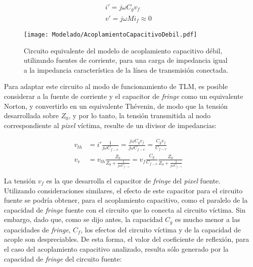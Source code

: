 \begin{subequations}
	\label{eq:expresiones-fuentes-controladas}
	\begin{align}
		i' = j \omega C_g v_f \\
		v' = j \omega M i_f \approx 0
	\end{align}
\end{subequations}

\begin{figure}[htp]
	\centering
	\texttt{[image: Modelado/AcoplamientoCapacitivoDebil.pdf]}
	\caption{Circuito equivalente del modelo de acoplamiento capacitivo débil, utilizando fuentes de corriente, para una carga de impedancia igual a la impedancia característica de la línea de transmisión conectada.}
	\label{fig:circuito-equivalente-acoplamiento-capacitivo-debil}
\end{figure}

Para adaptar este circuito al modo de funcionamiento de TLM, es posible considerar a la fuente de corriente y el capacitor de \textit{fringe} como un equivalente Norton, y convertirlo en un equivalente Thévenin, de modo que la tensión desarrollada sobre $Z_0$, y por lo tanto, la tensión transmitida al nodo correspondiente al \textit{pixel} víctima, resulte de un divisor de impedancias:

\begin{align}
	v_{th} & = i' \frac{1}{j\omega C_{f-v}} = \frac{j\omega C_g v_f}{j\omega C_{f-v}} = \frac{C_g v_f}{C_{f-v}} \\
	v_v & = v_{th} \frac{Z_0}{Z_0 + \frac{1}{j\omega C_{f-v}}} = v_f \frac{C_g}{C_{f-v}} \frac{Z_0}{Z_0 + \frac{1}{j\omega C_{f-v}}}
\end{align}



La tensión $v_f$ es la que desarrolla el capacitor de \textit{fringe} del \textit{pixel} fuente. Utilizando consideraciones similares, el efecto de este capacitor para el circuito fuente se podría obtener, para el acoplamiento capacitivo, como el paralelo de la capacidad de \textit{fringe} fuente con el circuito que lo conecta al circuito víctima. Sin embargo, dado que, como se dijo antes, la capacidad $C_g$ es mucho menor a las capacidades de \textit{fringe}, $C_{f}$, los efectos del circuito víctima y de la capacidad de acople son despreciables. De esta forma, el valor del coeficiente de reflexión, para el caso del acoplamiento capacitivo analizado, resulta sólo generado por la capacidad de \textit{fringe} del circuito fuente:

